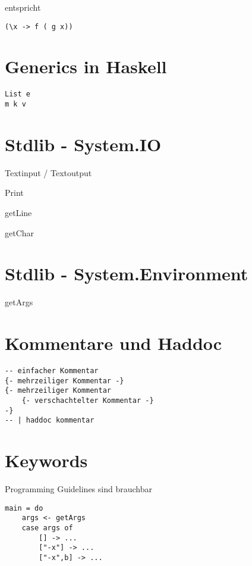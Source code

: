 \documentclass[ngerman]{report}
\begin{document}
entspricht\\

\begin{lstlisting}
(\x -> f ( g x))
\end{lstlisting}

\section{Generics in Haskell}

\begin{lstlisting}
List e
m k v
\end{lstlisting}

\section{Stdlib - System.IO}
\begin{compactitem}
\item Textinput / Textoutput
\begin{compactitem}
\item Print
\item getLine
\item getChar
\end{compactitem}
\end{compactitem}

\section{Stdlib - System.Environment}
\begin{compactitem}
\item getArgs
\end{compactitem}

\section{Kommentare und Haddoc}
\begin{lstlisting}
-- einfacher Kommentar
{- mehrzeiliger Kommentar -}
{- mehrzeiliger Kommentar 
	{- verschachtelter Kommentar -} 
-}
-- | haddoc kommentar
\end{lstlisting}

\section{Keywords}
Programming Guidelines sind brauchbar
\begin{lstlisting}
main = do 
	args <- getArgs
	case args of
		[] -> ...
		["-x"] -> ...
		["-x",b] -> ...
\end{lstlisting}
\end{document}

